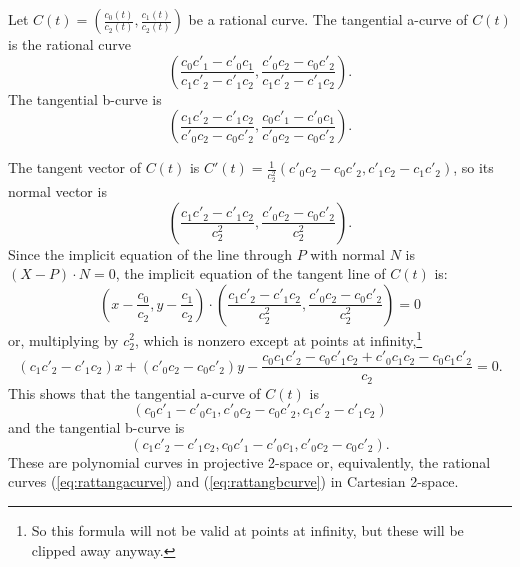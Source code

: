 \documentclass[12pt]{article}
\begin{document}
\begin{lemma}
\label{lem:rattangacurve}
Let $C(t) = (\frac{c_0(t)}{c_2(t)}, \frac{c_1(t)}{c_2(t)})$ be a rational curve.
The tangential a-curve of $C(t)$ is the rational curve
\begin{equation}
\label{eq:rattangacurve}
	(\frac{c_0 c'_1 - c'_0 c_1}{c_1 c'_2 - c'_1 c_2},
	 \frac{c'_0 c_2 - c_0 c'_2}{c_1 c'_2 - c'_1 c_2}).
\end{equation}
The tangential b-curve is
\begin{equation}
\label{eq:rattangbcurve}
	(\frac{c_1 c'_2 - c'_1 c_2}{c'_0 c_2 - c_0 c'_2},
	 \frac{c_0 c'_1 - c'_0 c_1}{c'_0 c_2 - c_0 c'_2}).
\end{equation}

\end{lemma}
\prf
The tangent vector of $C(t)$ is 
$C'(t) = \frac{1}{c_2^2} (c'_0 c_2 - c_0 c'_2, c'_1 c_2 - c_1 c'_2)$,
so its normal vector is 
\[
	(\frac{c_1 c'_2 - c'_1 c_2}{c_2^2}, 
	 \frac{c'_0 c_2 - c_0 c'_2}{c_2^2}).
\]
Since the implicit equation of the line through $P$ with normal $N$ is 
$(X-P) \cdot N = 0$,
the implicit equation of the tangent line of $C(t)$ is:
\[
	(x - \frac{c_0}{c_2}, y - \frac{c_1}{c_2}) \cdot
	(\frac{c_1 c'_2 - c'_1 c_2}{c_2^2},
	 \frac{c'_0 c_2 - c_0 c'_2}{c_2^2}) = 0
\]
or, multiplying by $c_2^2$, which is nonzero except at points at infinity,\footnote{So
	this formula will not be valid at points at infinity,
	but these will be clipped away anyway.}
\[
	(c_1 c'_2 - c'_1 c_2) x +
	(c'_0 c_2 - c_0 c'_2) y -
	\frac{c_0c_1c'_2 - c_0c'_1c_2 + c'_0c_1c_2 - c_0c_1c'_2}{c_2} = 0.
\]
This shows that the tangential a-curve of $C(t)$ is 
\[
	(c_0c'_1 - c'_0c_1, c'_0 c_2 - c_0 c'_2, c_1 c'_2 - c'_1 c_2)
\]
and the tangential b-curve is 
\[
	(c_1 c'_2 - c'_1 c_2, c_0c'_1 - c'_0c_1, c'_0 c_2 - c_0 c'_2).
\]
These are polynomial curves in projective 2-space or, equivalently, the rational
curves (\ref{eq:rattangacurve}) and (\ref{eq:rattangbcurve}) in Cartesian 2-space.
\QED
\end{document}
